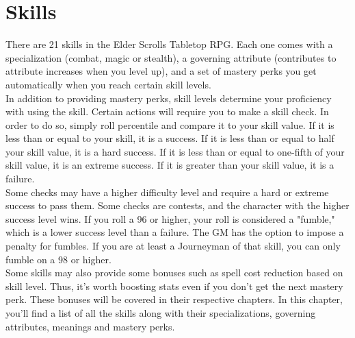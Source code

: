 \chapter{Skills}
There are 21 skills in the Elder Scrolls Tabletop RPG. Each one comes with a specialization (combat, magic or stealth), a governing attribute (contributes to attribute increases when you level up), and a set of mastery perks you get automatically when you reach certain skill levels.\\

In addition to providing mastery perks, skill levels determine your proficiency with using the skill. Certain actions will require you to make a skill check. In order to do so, simply roll percentile and compare it to your skill value. If it is less than or equal to your skill, it is a success. If it is less than or equal to half your skill value, it is a hard success. If it is less than or equal to one-fifth of your skill value, it is an extreme success. If it is greater than your skill value, it is a failure.\\

Some checks may have a higher difficulty level and require a hard or extreme success to pass them. Some checks are contests, and the character with the higher success level wins. If you roll a 96 or higher, your roll is considered a "fumble," which is a lower success level than a failure. The GM has the option to impose a penalty for fumbles. If you are at least a Journeyman of that skill, you can only fumble on a 98 or higher.\\

Some skills may also provide some bonuses such as spell cost reduction based on skill level. Thus, it's worth boosting stats even if you don't get the next mastery perk. These bonuses will be covered in their respective chapters. In this chapter, you'll find a list of all the skills along with their specializations, governing attributes, meanings and mastery perks.

